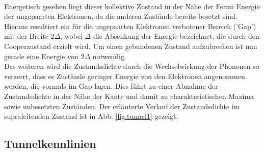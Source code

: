 \documentclass[twoside,        %
               BCOR12mm,       %
               english,ngerman, %
               fleqn,headsepline=false,footsepline=false
              ]{MFPREPORT}
\begin{document}
\\
Energetisch gesehen liegt dieser kollektive Zustand in der Nähe der Fermi Energie der ungepaarten Elektronen,
da die anderen Zustände bereits besetzt sind.
\\
Hieraus resultiert ein für die ungepaarten Elektronen verbotener Bereich ('Gap') mit der Breite $2 \Delta$, wobei $\Delta$ die Absenkung der Energie bezeichnet, die durch den Cooperzustand erzielt wird.
Um einen gebundenen Zustand aufzubrechen ist nun gerade eine Energie von $2 \Delta$ notwendig.
\\
Des weiteren wird die Zustandsdichte durch die Wechselwirkung der Phononen so verzerrt, dass es Zustände geringer Energie von den Elektronen angenommen werden, die vormals im Gap lagen. 
Dies führt zu einer Abnahme der Zustandsdichte in der Nähe der Kante und damit zu charakteristischen Maxima sowie unbesetzten Zuständen.
Der erläuterte Verlauf der Zustandsdichte im supraleitenden Zustand ist in Abb. \ref{fig:tunnel1} gezeigt.

\subsection{Tunnelkennlinien}
\end{document}
